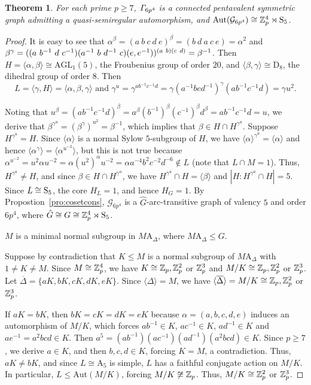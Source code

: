 \documentclass[12pt,reqno]{amsart}
\newcommand\A{\mathrm{A}} \newcommand\AGL{\mathrm{AGL}} \newcommand\AGammaL{\mathrm{A\Gamma L}} \newcommand\Alt{\mathrm{Alt}} \newcommand\ASL{\mathrm{ASL}} \newcommand\ASigmaL{\mathrm{A \Sigma L}} \newcommand\Aut{\mathrm{Aut}}
\newcommand\D{\mathrm{D}}   \def\det{{\sf det}}
\newcommand{\cG}{\mathcal{G}}
\numberwithin {equation} {section}
\newtheorem{theorem}{Theorem}[section]
\begin{document}
\begin{theorem}\label{insolubleauto:6p^4}
For each prime $p\geq 7$, ${\it \Gamma}_{6p^4}$ is a connected pentavalent symmetric graph admitting a quasi-semiregular automorphism,  and $\Aut(\cG_{6p^4})\cong \ZZ_p^4\rtimes\Sy_5$.
\end{theorem}
\begin{proof}
It is easy to see that $\alpha^\beta=(a\ b\ c\ d\ e)^\beta=(b\ d\ a\ c\ e)=\alpha^2$ and $\beta^\gamma=((a\ b^{-1}\ d\ c^{-1})(a^{-1}\ b\ d^{-1}\ c)(e,e^{-1}))^{(a\ b)(c\ d)}=\b^{-1}$.
Then $H=\langle \alpha,\beta\rangle\cong \AGL_{1}(5)$, the Froubenius group of order $20$, and
$\langle \beta,\gamma\rangle\cong \D_{8}$, the dihedral group of order $8$. Then
 \[L=\langle\gamma,H\rangle=\langle \alpha,\beta,\gamma\rangle \text{ and } {\gamma^u}=\gamma^{ab^{-1}c^{-1}d}=\gamma(a^{-1}bcd^{-1})^\gamma (ab^{-1}c^{-1}d)=\gamma u^2.\]

Noting that $u^\beta=(ab^{-1}c^{-1}d)^\beta=a^\beta (b^{-1})^\beta (c^{-1})^\beta d^\beta=ab^{-1}c^{-1}d=u$, we derive that $\beta^{\gamma^u}=(\beta^\gamma)^{u^2}=\beta^{-1}$, which implies that $\beta\in H\cap H^{\gamma^u}$.
Suppose $H^{\gamma^u}=H$. Since $\langle \alpha\rangle$ is a normal Sylow $5$-subgroup of $H$, we have $\langle\alpha\rangle^{\gamma^u}=\langle\alpha\rangle$ and hence $\langle \alpha^\gamma\rangle=\langle\alpha^{u^{-2}}\rangle$,
but this is not true because $\alpha^{u^{-2}}=u^2\alpha u^{-2}=\alpha (u^2)^\alpha u^{-2}=\alpha a^{-4}b^2c^{-2}d^{-6}\not\in L$ (note that $L\cap M=1$). Thus, $H^{\gamma^u}\not=H$, and since $\beta\in H\cap H^{\gamma^u}$, we have $H^{\gamma^u}\cap H=\langle \beta\rangle$ and $|H:H^{\gamma^u}\cap H|=5$. Since $L\cong\mathrm{S}_5$, the core $H_L=1$, and hence $H_G=1$. By Propostion~\ref{pro:cosetcons},
 $\cG_{6p^4}$ is a $\hat{G}$-arc-transitive graph of valency $5$ and order $6p^4$, where $\hat{G}\cong  G \cong \mathbb{Z}_p^4\rtimes\mathrm{S}_5$.




 \vskip 0.2cm
 $M$ is a minimal normal subgroup in $M\A_\Delta$, where $M\A_\Delta\leq G$.

Suppose by contradiction that $K\leq M$ is a normal subgroup of $M\A_\Delta$ with $1\not=K\not=M$. Since $M\cong\mathbb{Z}_p^4$, we have $K\cong \mathbb{Z}_p, \mathbb{Z}_p^2$ or $\mathbb{Z}_p^3$ and $M/K\cong \mathbb{Z}_p, \mathbb{Z}_p^2$ or $\mathbb{Z}_p^3$. Let $\overline{\Delta}=\{aK,bK,cK,dK,eK\}$. Since $\langle \Delta \rangle=M$, we have
$\langle \overline{\Delta}\rangle=M/K\cong \mathbb{Z}_p, \mathbb{Z}_p^2$ or $\mathbb{Z}_p^3$.

If $aK=bK$, then $bK=cK=dK=eK$ because $\alpha=(a, b,c,d,e)$ induces an automorphism of $M/K$, which forces $ab^{-1}\in K$, $ac^{-1}\in K$, $ad^{-1}\in K$ and $ae^{-1}=a^2bcd\in K$. Then $
 a^5=(ab^{-1})(ac^{-1})(ad^{-1})(a^2bcd) \in K$. Since $p\geq 7$, we derive $a\in K$, and then  $b,c,d\in K$, forcing $K=M$, a contradiction. Thus, $aK\not=bK$, and since $L\cong\A_5$ is simple, $L$ has a faithful conjugate action on $M/K$. In particular, $L\leq \Aut(M/K)$, forcing  $M/K\not\cong\mathbb{Z}_p$. Thus, $M/K\cong \mathbb{Z}_p^2$ or $\mathbb{Z}_p^3$.


\end{proof}
\end{document}

